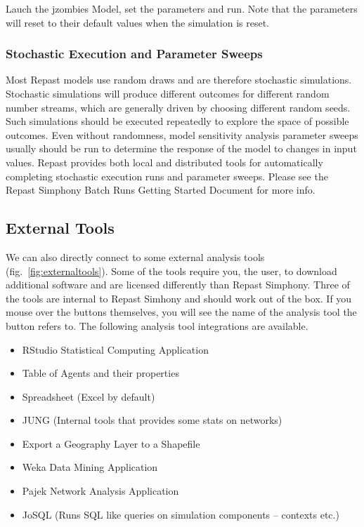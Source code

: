 \documentclass[11pt]{amsart}
\begin{document}
Lauch the jzombies Model, set the parameters and run. Note that the parameters will reset to their default values when the simulation is reset.

\subsubsection{Stochastic Execution and Parameter Sweeps}

Most Repast models use random draws and are therefore stochastic simulations. Stochastic simulations will produce different outcomes for different random number streams, which are generally driven by choosing different random seeds. Such simulations should be executed repeatedly to explore the space of possible outcomes. Even without randomness, model sensitivity analysis parameter sweeps usually should be run to determine the response of the model to changes in input values. Repast provides both local and distributed tools for automatically completing stochastic execution runs and parameter sweeps. Please see the Repast Simphony Batch Runs Getting Started Document for more info.

\subsection{External Tools}

We can also directly connect to some external analysis tools (fig.~\ref{fig:externaltools}). Some of the tools require you, the user, to download additional software and are licensed differently than Repast Simphony. Three of the tools are internal to Repast Simhony and should work out of the box. If you mouse over the buttons themselves, you will see the name of the analysis tool the button refers to. The following analysis tool integrations are available.

\vspace{.2in}
\begin{itemize}
\item RStudio Statistical Computing Application
\item Table of Agents and their properties
\item Spreadsheet (Excel by default)
\item JUNG (Internal tools that provides some stats on networks)
\item Export a Geography Layer to a Shapefile
\item Weka Data Mining Application
\item Pajek Network Analysis Application
\item JoSQL (Runs SQL like queries on simulation components -- contexts etc.)
\end{itemize}
\vspace{.2in}
\end{document}
